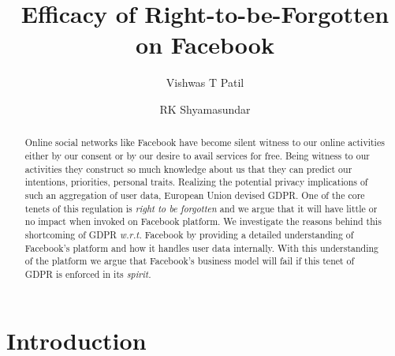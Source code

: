 \documentclass[runningheads]{llncs}
\begin{document}
\title{Efficacy of Right-to-be-Forgotten on Facebook}
\author{Vishwas T Patil \and RK Shyamasundar}
%
%

\maketitle              %
%
\begin{abstract}
  Online social networks like Facebook have become silent witness to
  our online activities either by our consent or by our desire to
  avail services for free. Being witness to our activities they
  construct so much knowledge about us that they can predict our
  intentions, priorities, personal traits. Realizing the potential
  privacy implications of such an aggregation of user data, European
  Union devised GDPR. One of the core tenets of this regulation is
  \textit{right to be forgotten} and we argue that it will have little
  or no impact when invoked on Facebook platform. We investigate the
  reasons behind this shortcoming of GDPR \textit{w.r.t.} Facebook by
  providing a detailed understanding of Facebook's platform and how it
  handles user data internally. With this understanding of the
  platform we argue that Facebook's business model will fail if this
  tenet of GDPR is enforced in its \textit{spirit.}


\end{abstract}


\section{Introduction}
\end{document}
